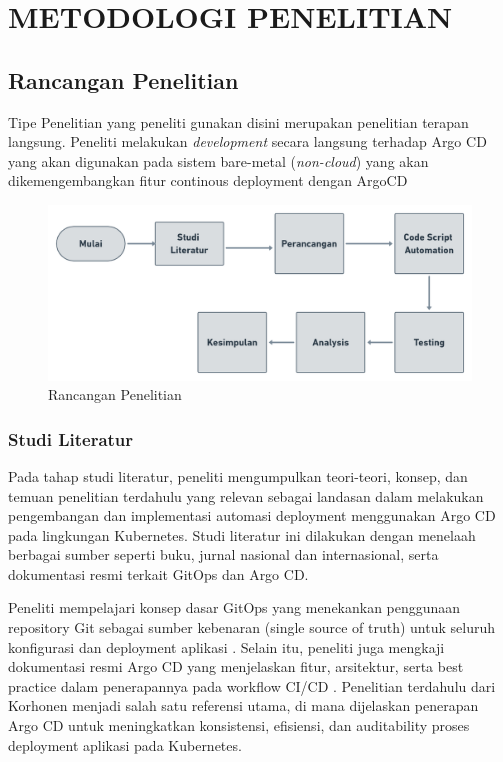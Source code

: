 \renewcommand{\chaptername}{BAB}
\chapter{METODOLOGI PENELITIAN}
\vspace{4.5pt}
\setlength{\parskip}{0.5em}
\section{Rancangan Penelitian}\label{sec:rancangan_penelitian}
Tipe Penelitian yang peneliti gunakan disini merupakan penelitian terapan
langsung. Peneliti melakukan \textit{development} secara langsung terhadap Argo
CD yang akan digunakan pada sistem bare-metal (\textit{non-cloud}) yang akan
dikemengembangkan fitur continous deployment dengan ArgoCD

\begin{figure}[h]
  \centering
  \includegraphics[width=1\textwidth]{figures/Tahapan Skripsi.png}
  \caption{Rancangan Penelitian}
\end{figure}

\subsection{Studi Literatur}\label{subsec:studi_literatur}
Pada tahap studi literatur, peneliti mengumpulkan teori-teori, konsep, dan
temuan penelitian terdahulu yang relevan sebagai landasan dalam melakukan
pengembangan dan implementasi automasi deployment menggunakan Argo CD pada
lingkungan Kubernetes. Studi literatur ini dilakukan dengan menelaah berbagai
sumber seperti buku, jurnal nasional dan internasional, serta dokumentasi resmi
terkait GitOps dan Argo CD.

Peneliti mempelajari konsep dasar GitOps yang menekankan penggunaan repository
Git sebagai sumber kebenaran (single source of truth) untuk seluruh konfigurasi
dan deployment aplikasi \cite{Weaveworks2017}. Selain itu, peneliti juga
mengkaji dokumentasi resmi Argo CD yang menjelaskan fitur, arsitektur, serta
best practice dalam penerapannya pada workflow CI/CD \cite{ArgoCDDocs}.
Penelitian terdahulu dari Korhonen \cite{Korhonen2021} menjadi salah satu
referensi utama, di mana dijelaskan penerapan Argo CD untuk meningkatkan
konsistensi, efisiensi, dan auditability proses deployment aplikasi pada
Kubernetes.

